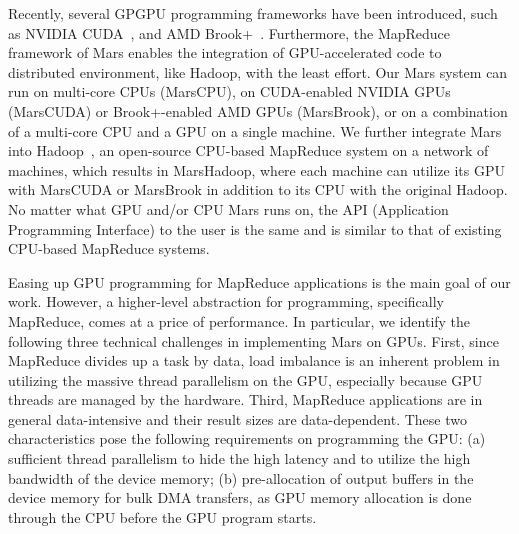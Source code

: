 Recently, several GPGPU programming frameworks have been introduced, such as NVIDIA CUDA~\cite{CUDA}, and AMD Brook+~\cite{BROOKPLUS}.
 Furthermore, the MapReduce framework of Mars enables the integration of GPU-accelerated code to distributed environment, like Hadoop, with the least effort.
Our Mars system can run on multi-core CPUs (MarsCPU), on CUDA-enabled NVIDIA GPUs (MarsCUDA) or Brook+-enabled AMD GPUs (MarsBrook), or on a combination of a multi-core CPU and a GPU on a single machine.
We further integrate Mars into Hadoop~\cite{HADOOP}, an open-source CPU-based MapReduce system on a
network of machines, which results in MarsHadoop, where each machine can utilize its GPU with MarsCUDA or MarsBrook
in addition to its CPU with the original Hadoop. No matter what GPU and/or CPU Mars runs on, the API (Application
Programming Interface) to the user is the same and is similar to that of existing CPU-based MapReduce systems.

Easing up GPU programming for MapReduce applications is the main goal of our work. However, a higher-level
abstraction for programming, specifically MapReduce, comes at a price of performance.
In particular, we identify the following three technical challenges in implementing Mars on GPUs.
First, since MapReduce divides up a task by data, load imbalance is an inherent problem in utilizing
the massive thread parallelism on the GPU, especially because GPU threads are managed by the hardware.
Third, MapReduce applications are in general data-intensive and their result sizes are data-dependent. These two characteristics pose the following requirements on programming the GPU: (a) sufficient  thread parallelism to hide the high latency and to utilize the high bandwidth of the device memory; (b) pre-allocation of output buffers in the device memory for bulk DMA transfers, as GPU memory allocation is done through the CPU before the GPU program starts.

